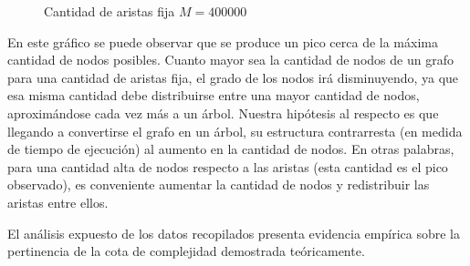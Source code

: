     \begin{figure}[H]
        \centering
        \caption{Cantidad de aristas fija $M = 400000$}
        \label{fig:exp2:m_fijo}
    \end{figure}

    En este gráfico se puede observar que se produce un pico cerca de la máxima cantidad de nodos posibles. Cuanto mayor sea la cantidad de nodos de un grafo para una cantidad de aristas fija, el grado de los nodos irá disminuyendo, ya que esa misma cantidad debe distribuirse entre una mayor cantidad de nodos, aproximándose cada vez más a un árbol. Nuestra hipótesis al respecto es que llegando a convertirse el grafo en un árbol, su estructura contrarresta (en medida de tiempo de ejecución) al aumento en la cantidad de nodos. En otras palabras, para una cantidad alta de nodos respecto a las aristas (esta cantidad es el pico observado), es conveniente aumentar la cantidad de nodos y redistribuir las aristas entre ellos.

    El análisis expuesto de los datos recopilados presenta evidencia empírica sobre la pertinencia de la cota de complejidad demostrada teóricamente.
